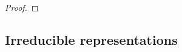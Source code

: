 \documentclass[12pt, a4paper, twoside]{article}
\theoremstyle{definition}
\theoremstyle{remark}
\numberwithin{equation}{section}
\newcommand{\1}{\mathbf{1}}
\newcommand{\0}{\mathbf{0}}
\newcommand{\id}{\text{id}}
\newcommand{\vvec}{\mathbf{v}}
\newcommand{\wvec}{\mathbf{w}}
\begin{document}
\begin{proof}
%		
%		
%		
%		
%		
%		
%		
	\end{proof}
	
\subsection{Irreducible representations}
		
		
		
		


\clearpage{\thispagestyle{empty}}



% 
\end{document}
